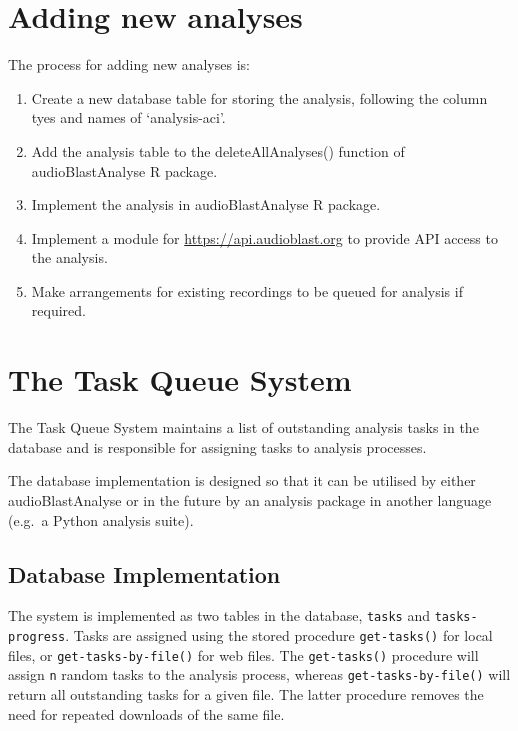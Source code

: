 \documentclass[
]{book}
\begin{document}
\hypertarget{adding-new-analyses}{%
\chapter{Adding new analyses}\label{adding-new-analyses}}

The process for adding new analyses is:

\begin{enumerate}
\def\labelenumi{\arabic{enumi}.}
\item
  Create a new database table for storing the analysis, following the column tyes and names of `analysis-aci'.
\item
  Add the analysis table to the deleteAllAnalyses() function of audioBlastAnalyse R package.
\item
  Implement the analysis in audioBlastAnalyse R package.
\item
  Implement a module for \url{https://api.audioblast.org} to provide API access to the analysis.
\item
  Make arrangements for existing recordings to be queued for analysis if required.
\end{enumerate}

\hypertarget{the-task-queue-system}{%
\chapter{The Task Queue System}\label{the-task-queue-system}}

The Task Queue System maintains a list of outstanding analysis tasks in the database and is responsible for assigning tasks to analysis processes.

The database implementation is designed so that it can be utilised by either audioBlastAnalyse or in the future by an analysis package in another language (e.g.~a Python analysis suite).

\hypertarget{database-implementation}{%
\section{Database Implementation}\label{database-implementation}}

The system is implemented as two tables in the database, \texttt{tasks} and \texttt{tasks-progress}. Tasks are assigned using the stored procedure \texttt{get-tasks()} for local files, or \texttt{get-tasks-by-file()} for web files. The \texttt{get-tasks()} procedure will assign \texttt{n} random tasks to the analysis process, whereas \texttt{get-tasks-by-file()} will return all outstanding tasks for a given file. The latter procedure removes the need for repeated downloads of the same file.
\end{document}
